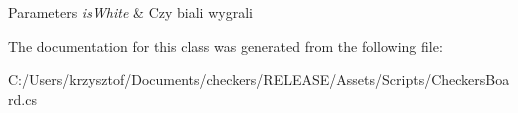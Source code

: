 \begin{DoxyParams}{Parameters}
{\em is\+White} & Czy biali wygrali\\
\hline
\end{DoxyParams}


The documentation for this class was generated from the following file\+:\begin{DoxyCompactItemize}
\item 
C\+:/\+Users/krzysztof/\+Documents/checkers/\+R\+E\+L\+E\+A\+S\+E/\+Assets/\+Scripts/Checkers\+Board.\+cs\end{DoxyCompactItemize}
